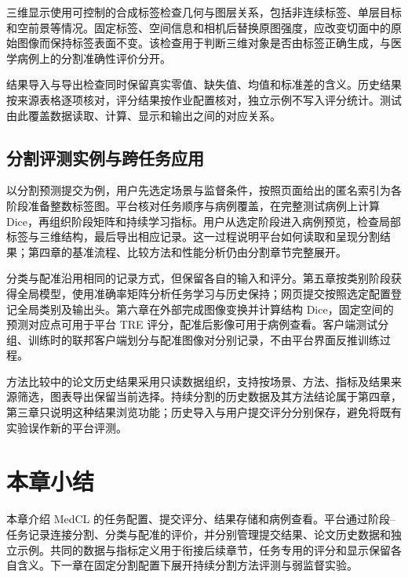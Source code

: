 三维显示使用可控制的合成标签检查几何与图层关系，包括非连续标签、单层目标和空前景等情况。固定标签、空间信息和相机后替换原图强度，应改变切面中的原始图像而保持标签表面不变。该检查用于判断三维对象是否由标签正确生成，与医学病例上的分割准确性评价分开。

结果导入与导出检查同时保留真实零值、缺失值、均值和标准差的含义。历史结果按来源表格逐项核对，评分结果按作业配置核对，独立示例不写入评分统计。测试由此覆盖数据读取、计算、显示和输出之间的对应关系。

\subsection{分割评测实例与跨任务应用}
\label{sec:benchmark-platform-connection}

以分割预测提交为例，用户先选定场景与监督条件，按照页面给出的匿名索引为各阶段准备整数标签图。平台核对任务顺序与病例覆盖，在完整测试病例上计算 Dice，再组织阶段矩阵和持续学习指标。用户从选定阶段进入病例预览，检查局部标签与三维结构，最后导出相应记录。这一过程说明平台如何读取和呈现分割结果；第四章的基准流程、比较方法和性能分析仍由分割章节完整展开。

分类与配准沿用相同的记录方式，但保留各自的输入和评分。第五章按类别阶段获得全局模型，使用准确率矩阵分析任务学习与历史保持；网页提交按照选定配置登记全局类别及输出头。第六章在外部完成图像变换并计算结构 Dice，固定空间的预测对应点可用于平台 TRE 评分，配准后影像可用于病例查看。客户端测试分组、训练时的联邦客户端划分与配准图像对分别记录，不由平台界面反推训练过程。

方法比较中的论文历史结果采用只读数据组织，支持按场景、方法、指标及结果来源筛选，图表导出保留当前选择。持续分割的历史数据及其方法结论属于第四章，第三章只说明这种结果浏览功能；历史导入与用户提交评分分别保存，避免将既有实验误作新的平台评测。

\FloatBarrier

\section{本章小结}
\label{sec:benchmark-summary}

本章介绍 MedCL 的任务配置、提交评分、结果存储和病例查看。平台通过阶段--任务记录连接分割、分类与配准的评价，并分别管理提交结果、论文历史数据和独立示例。共同的数据与指标定义用于衔接后续章节，任务专用的评分和显示保留各自含义。下一章在固定分割配置下展开持续分割方法评测与弱监督实验。
